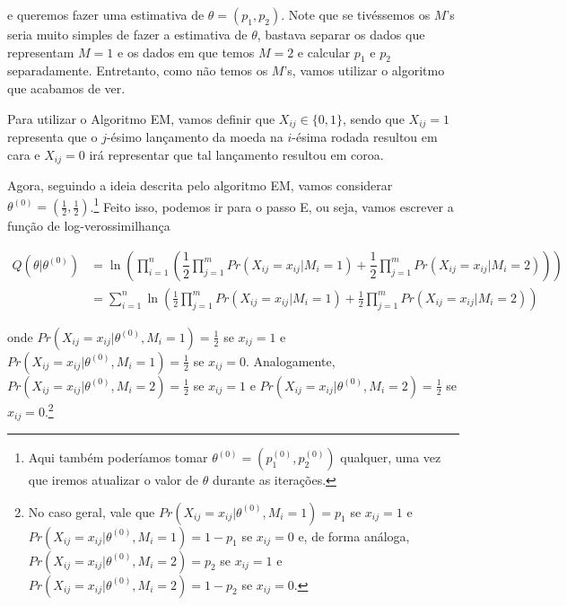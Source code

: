 \documentclass{article}
\begin{document}
\noindent e queremos fazer uma estimativa de $\theta = (p_1, p_2)$. Note que se tivéssemos os $M$'s seria muito simples de fazer a estimativa de $\theta$, bastava separar os dados que representam $M = 1$ e os dados em que temos $M = 2$ e calcular $p_1$ e $p_2$ separadamente. Entretanto, como não temos os $M$'s, vamos utilizar o algoritmo que acabamos de ver.

Para utilizar o Algoritmo EM, vamos definir que $X_{ij} \in \{0, 1\}$, sendo que $X_{ij} = 1$ representa que o $j$-ésimo lançamento da moeda na $i$-ésima rodada resultou em cara e $X_{ij} = 0$ irá representar que tal lançamento resultou em coroa.

Agora, seguindo a ideia descrita pelo algoritmo EM, vamos considerar $\theta^{(0)} = \left(\frac{1}{2}, \frac{1}{2}\right)$.\footnote{Aqui também poderíamos tomar $\theta^{(0)} = \left(p_1^{(0)}, p_2^{(0)}\right)$ qualquer, uma vez que iremos atualizar o valor de $\theta$ durante as iterações.} Feito isso, podemos ir para o passo E, ou seja, vamos escrever a função de log-verossimilhança

\begin{equation*}
    \begin{split}
        Q\left(\theta | \theta^{(0)}\right) & = \ln{\left(\prod_{i = 1}^{n} \left(\dfrac{1}{2}\prod_{j = 1}^{m} Pr\left(X_{ij} = x_{ij} | M_i = 1\right) + \dfrac{1}{2}\prod_{j = 1}^{m} Pr\left(X_{ij} = x_{ij} | M_i = 2\right)\right)\right)} \\
        & = \sum_{i = 1}^{n} \ln{\left(\frac{1}{2}\prod_{j = 1}^{m} Pr(X_{ij} = x_{ij} | M_i = 1) + \frac{1}{2}\prod_{j = 1}^{m} Pr(X_{ij} = x_{ij} | M_i = 2)\right)}
    \end{split}
\end{equation*}

\noindent onde $Pr\left(X_{ij} = x_{ij} | \theta^{(0)}, M_i = 1\right) = \frac{1}{2}$ se $x_{ij} = 1$ e $Pr\left(X_{ij} = x_{ij} | \theta^{(0)}, M_i = 1\right) = \frac{1}{2}$ se $x_{ij} = 0$. Analogamente, $Pr\left(X_{ij} = x_{ij} | \theta^{(0)}, M_i = 2\right) = \frac{1}{2}$ se $x_{ij} = 1$ e $Pr\left(X_{ij} = x_{ij} | \theta^{(0)}, M_i = 2\right) = \frac{1}{2}$ se $x_{ij} = 0$.\footnote{No caso geral, vale que $Pr\left(X_{ij} = x_{ij} | \theta^{(0)}, M_i = 1\right) = p_1$ se $x_{ij} = 1$ e $Pr\left(X_{ij} = x_{ij} | \theta^{(0)}, M_i = 1\right) = 1 - p_1$ se $x_{ij} = 0$ e, de forma análoga, $Pr\left(X_{ij} = x_{ij} | \theta^{(0)}, M_i = 2\right) = p_2$ se $x_{ij} = 1$ e $Pr\left(X_{ij} = x_{ij} | \theta^{(0)}, M_i = 2\right) = 1 - p_2$ se $x_{ij} = 0$.}
\end{document}
